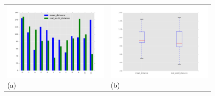 		    
\begin{figure}[h]
	\centering
	\begin{tabular}{m{7.0cm} m{7.0cm}}
	\includegraphics[width=7cm]{img/evaluation/big_bar}
	\centering \small (a)
	&
	\includegraphics[width=7cm]{img/evaluation/big_box}
	\centering \small (b)
	\end{tabular}
    \caption{}
    \label{fig:eval_big}
\end{figure}

